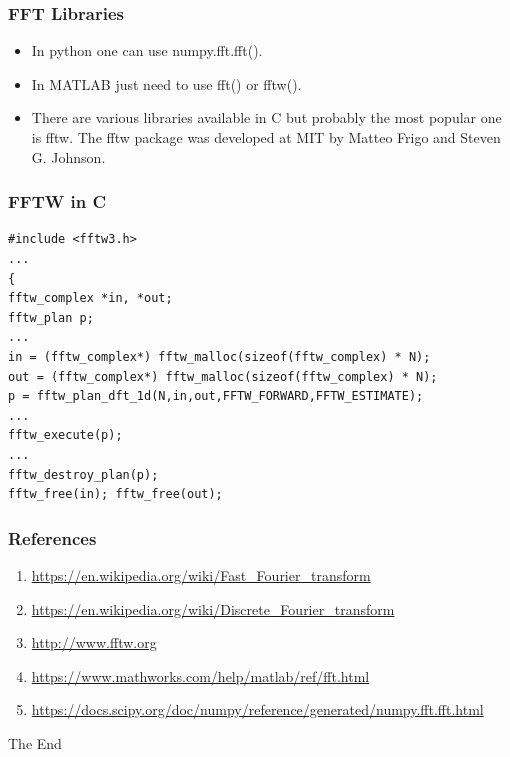 \documentclass{beamer}
\begin{document}
\begin{frame}
\frametitle{FFT Libraries}
\begin{itemize}
\item In python one can use numpy.fft.fft().
\item In MATLAB just need to use fft() or fftw().
\item There are various libraries available in C but probably the most popular one is fftw. The fftw package was developed at MIT by Matteo Frigo and Steven G. Johnson.  
\end{itemize}
\end{frame}

\begin{frame}[fragile] %
\frametitle{FFTW in C}
\begin{example}
\begin{verbatim}
#include <fftw3.h>
...
{
fftw_complex *in, *out;
fftw_plan p;
...
in = (fftw_complex*) fftw_malloc(sizeof(fftw_complex) * N);
out = (fftw_complex*) fftw_malloc(sizeof(fftw_complex) * N);
p = fftw_plan_dft_1d(N,in,out,FFTW_FORWARD,FFTW_ESTIMATE);
...
fftw_execute(p);
...
fftw_destroy_plan(p);
fftw_free(in); fftw_free(out);
\end{verbatim}
\end{example}
\end{frame}









\begin{frame}
\frametitle{References}
\begin{enumerate}
\item\url{https://en.wikipedia.org/wiki/Fast_Fourier_transform}
\item\url{https://en.wikipedia.org/wiki/Discrete_Fourier_transform}
\item\url{http://www.fftw.org}
\item\url{https://www.mathworks.com/help/matlab/ref/fft.html}
\item\url{https://docs.scipy.org/doc/numpy/reference/generated/numpy.fft.fft.html}		
\end{enumerate}
\end{frame}


\begin{frame}
\Huge{\centerline{The End}}
\end{frame}

\end{document}
